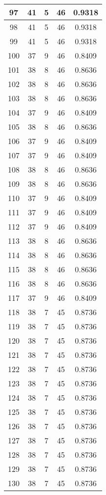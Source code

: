 \documentclass[letterpaper, 12pt]{article}
\begin{document}
\begin{longtable}{|c|c|c|c|c|}
\hline
97 & 41 & 5 & 46 & 0.9318 \\
\hline
98 & 41 & 5 & 46 & 0.9318 \\
\hline
99 & 41 & 5 & 46 & 0.9318 \\
\hline
100 & 37 & 9 & 46 & 0.8409 \\
\hline
101 & 38 & 8 & 46 & 0.8636 \\
\hline
102 & 38 & 8 & 46 & 0.8636 \\
\hline
103 & 38 & 8 & 46 & 0.8636 \\
\hline
104 & 37 & 9 & 46 & 0.8409 \\
\hline
105 & 38 & 8 & 46 & 0.8636 \\
\hline
106 & 37 & 9 & 46 & 0.8409 \\
\hline
107 & 37 & 9 & 46 & 0.8409 \\
\hline
108 & 38 & 8 & 46 & 0.8636 \\
\hline
109 & 38 & 8 & 46 & 0.8636 \\
\hline
110 & 37 & 9 & 46 & 0.8409 \\
\hline
111 & 37 & 9 & 46 & 0.8409 \\
\hline
112 & 37 & 9 & 46 & 0.8409 \\
\hline
113 & 38 & 8 & 46 & 0.8636 \\
\hline
114 & 38 & 8 & 46 & 0.8636 \\
\hline
115 & 38 & 8 & 46 & 0.8636 \\
\hline
116 & 38 & 8 & 46 & 0.8636 \\
\hline
117 & 37 & 9 & 46 & 0.8409 \\
\hline
118 & 38 & 7 & 45 & 0.8736 \\
\hline
119 & 38 & 7 & 45 & 0.8736 \\
\hline
120 & 38 & 7 & 45 & 0.8736 \\
\hline
121 & 38 & 7 & 45 & 0.8736 \\
\hline
122 & 38 & 7 & 45 & 0.8736 \\
\hline
123 & 38 & 7 & 45 & 0.8736 \\
\hline
124 & 38 & 7 & 45 & 0.8736 \\
\hline
125 & 38 & 7 & 45 & 0.8736 \\
\hline
126 & 38 & 7 & 45 & 0.8736 \\
\hline
127 & 38 & 7 & 45 & 0.8736 \\
\hline
128 & 38 & 7 & 45 & 0.8736 \\
\hline
129 & 38 & 7 & 45 & 0.8736 \\
\hline
130 & 38 & 7 & 45 & 0.8736 \\

\end{longtable}
\end{document}
